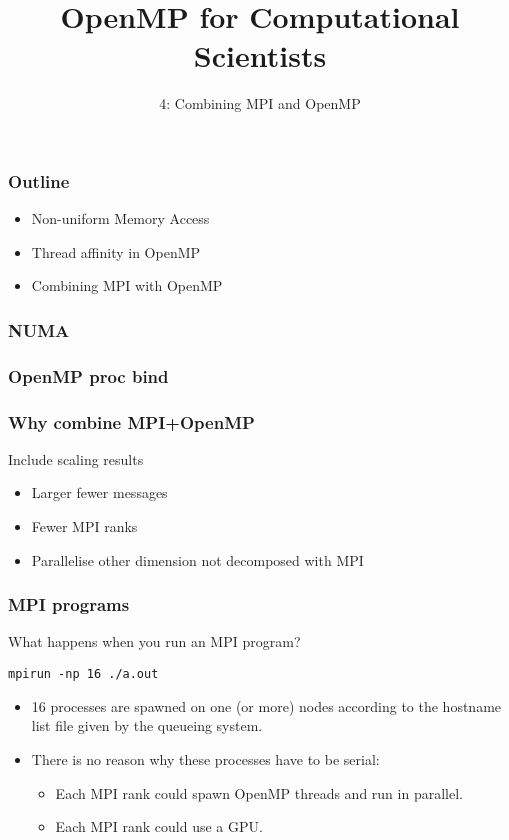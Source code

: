 \documentclass{beamer}
\title{OpenMP for Computational Scientists}
\subtitle{4: Combining MPI and OpenMP}
\begin{document}
\frame{\titlepage}

\begin{frame}
\frametitle{Outline}
\begin{itemize}
  \item Non-uniform Memory Access
  \item Thread affinity in OpenMP
  \item Combining MPI with OpenMP
\end{itemize}
\end{frame}

\begin{frame}
\frametitle{NUMA}
\end{frame}

\begin{frame}
\frametitle{OpenMP proc bind}
\end{frame}

\begin{frame}
\frametitle{Why combine MPI+OpenMP}
Include scaling results
\begin{itemize}
  \item Larger fewer messages
  \item Fewer MPI ranks
  \item Parallelise other dimension not decomposed with MPI
\end{itemize}
\end{frame}

\begin{frame}[fragile]
\frametitle{MPI programs}
What happens when you run an MPI program?
\begin{verbatim}
mpirun -np 16 ./a.out
\end{verbatim}

\begin{itemize}
  \item 16 processes are spawned on one (or more) nodes according to the hostname list file given by the queueing system.
  \item There is no reason why these processes have to be serial:
  \begin{itemize}
    \item Each MPI rank could spawn OpenMP threads and run in parallel.
    \item Each MPI rank could use a GPU.
  \end{itemize}
\end{itemize}

\end{frame}
\end{document}
